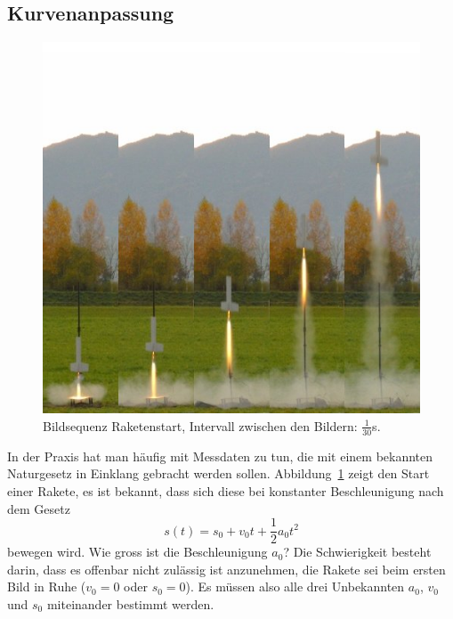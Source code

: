%
%
\subsection{Kurvenanpassung}
\begin{figure}
\begin{center}
\includegraphics[width=0.6\hsize]{graphics/stummel}
\end{center}
\caption{Bildsequenz Raketenstart, Intervall zwischen den Bildern: $\frac1{30}$s.
\label{stummel}}
\end{figure}
In der Praxis hat man häufig mit Messdaten zu tun, die mit einem
bekannten Naturgesetz in Einklang gebracht werden sollen.
Abbildung~\ref{stummel} zeigt den Start einer Rakete, es ist
bekannt, dass sich diese bei konstanter Beschleunigung nach dem
Gesetz
\[
s(t)=s_0+v_0t+\frac12a_0t^2
\]
bewegen wird. Wie gross ist die Beschleunigung $a_0$?
Die Schwierigkeit besteht darin, dass es offenbar nicht zulässig ist
anzunehmen, die Rakete sei beim ersten Bild in Ruhe ($v_0=0$ oder
$s_0=0$). Es müssen also alle drei Unbekannten $a_0$, $v_0$
und $s_0$ miteinander bestimmt werden.

